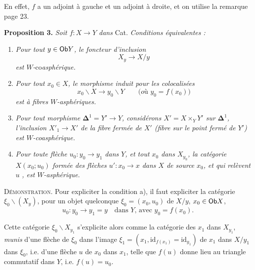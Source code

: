 En effet, $f$ a un adjoint à gauche et un adjoint à droite, et on utilise la remarque page 23.

\textbf{Proposition 3.} \textit{Soit $f : X \longrightarrow Y$ dans} \textup{Cat}. \textit{Conditions équivalentes :}


\begin{enumerate}
\item[\textit{a)}] \textit{Pour tout $y \in \mathsf{Ob} Y$, le foncteur d'inclusion}
\[
X_y \longrightarrow X/y \tag*{$(*)$}
\]
\textit{est $W$-}co\textit{asphérique.}
\item[\textit{b)}] \textit{Pour tout $x_0 \in X$, le morphisme induit pour les colocalisées}
\[
x_0\backslash X \longrightarrow y_0\backslash Y \qquad \textit{(où $y_0 = f(x_0)$)}
\]
\textit{est à fibres $W$-asphériques.}
\item[\textit{c)}] \textit{Pour tout morphisme $\mathbf{\Delta}^1 = Y' \longrightarrow Y$, considérons $X' = X \times_Y Y'$ sur $\mathbf{\Delta}^1$, l'inclusion $X'_1 \longrightarrow X'$ de la fibre fermée de $X'$ (fibre sur le point fermé de $Y'$) est $W$-coasphérique.}
\item[\textit{d)}] \textit{Pour toute flèche $u_0 : y_0 \longrightarrow y_1$ dans $Y$, et tout $x_0$ dans $X_{y_0}$, la catégorie $X(x_0;u_0)$ formée des flèches $u' : x_0 \longrightarrow x$ dans $X$ de source $x_0$, et qui relèvent $u$} \textit{, est $W$-asphérique.}
\end{enumerate}

\textsc{Démonstration.} Pour expliciter la condition a), il faut expliciter la catégorie $\xi_0\backslash(X_y)$, pour un objet quelconque $\xi_0 = (x_0, u_0)$ de $X/y$, $x_0 \in \mathsf{Ob} X$,
\[
u_0 : y_0 \longrightarrow y_1 = y \quad \text{dans $Y$, avec $y_0 = f(x_0)$.}
\]

Cette catégorie $\xi_0\backslash X_{y_1}$ s'explicite alors comme la catégorie des $x_1$ dans $X_{y_1}$, \textit{munis} d'une flèche de $\xi_0$ dans l'image $\xi_1 = (x_1, \mathrm{id}_{f(x_1)} = \mathrm{id}_{y_1})$ de $x_1$ dans $X/y_1$ dans $\xi_0$, i.e. d'une flèche $u$ de $x_0$ dans $x_1$, telle que $f(u)$ donne lieu au triangle commutatif dans $Y$, i.e. $f(u) = u_0$. %

\begin{center}
\end{center}

